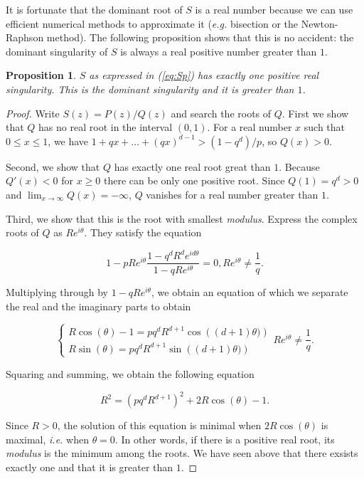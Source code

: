 \documentclass{article}
\newtheorem{proposition}{Proposition}
\begin{document}
It is fortunate that the dominant root of $S$ is a real number because we
can use efficient numerical methods to approximate it (\textit{e.g.}
bisection or the Newton-Raphson method). The following proposition shows
that this is no accident: the dominant singularity of $S$ is always a real
positive number greater than $1$.

\begin{proposition}
\label{th:roots}
$S$ as expressed in (\ref{eq:Sp}) has exactly one positive real
singularity. This is the dominant singularity and it is greater than $1$.
\end{proposition}

\begin{proof}
Write $S(z) = P(z)/Q(z)$ and search the roots of $Q$. First we show that
$Q$ has no real root in the interval $(0,1)$. For a real number $x$ such
that $0\leq x \leq 1$, we have $1+qx+\ldots+(qx)^{d-1} > (1-q^d)/p$,
so $Q(x) > 0$.

Second, we show that $Q$ has exactly one real root great than $1$. Because
$Q'(x) < 0$ for $x \geq 0$ there can be only one positive root.  Since
$Q(1) = q^d > 0$ and $\lim_{x\rightarrow \infty} Q(x) = -\infty$, $Q$
vanishes for a real number greater than $1$.

Third, we show that this is the root with smallest \textit{modulus}.
Express the complex roots of $Q$ as $Re^{i\theta}$. They satisfy the
equation

\begin{equation*}
1-pRe^{i\theta}\frac{1-q^dR^de^{id\theta}}{1-qRe^{i\theta}} = 0,
Re^{i\theta} \neq \frac{1}{q}.
\end{equation*}

Multiplying through by $1-qRe^{i\theta}$, we obtain an equation of which
we separate the real and the imaginary parts to obtain

\begin{equation*}
\left\{
\begin{array}{ll}
R \cos (\theta) -1 = pq^dR^{d+1} \cos \left( (d+1) \theta) \right) \\
R \sin (\theta) = pq^dR^{d+1} \sin \left( (d+1) \theta) \right)
\end{array}
\right. Re^{i\theta} \neq \frac{1}{q}.
\end{equation*}

Squaring and summing, we obtain the following equation

\begin{equation*}
R^2 = (pq^dR^{d+1})^2 + 2R \cos(\theta) -1.
\end{equation*}

Since $R > 0$, the solution of this equation is minimal when
$2R\cos(\theta)$ is maximal, \textit{i.e.} when $\theta = 0$. In other
words, if there is a positive real root, its \textit{modulus} is the
minimum among the roots. We have seen above that there exsists exactly one
and that it is greater than $1$.
\end{proof}
\end{document}
